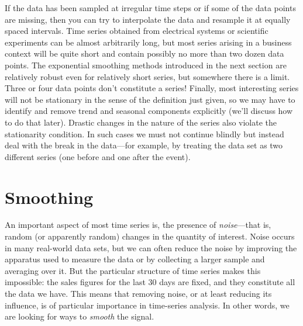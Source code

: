 If the data has been sampled at irregular time steps or if some of the
data points are missing, then you can try to interpolate the data and
resample it at equally spaced intervals. Time series obtained from
electrical systems or scientific experiments can be almost arbitrarily
long, but most series arising in a business context will be quite
short and contain possibly no more than two dozen data points. The
exponential smoothing methods introduced in the next section are
relatively robust even for relatively short series, but somewhere
there is a limit. Three or four data points don't constitute a series!
Finally, most interesting series will not be stationary in the sense
of the definition just given, so we may have to identify and remove
trend and seasonal components explicitly (we'll discuss how to do that
later). Drastic changes in the nature of the series also violate the
stationarity condition. In such cases we must not continue blindly but
instead deal with the break in the data---for example, by treating the
data set as two different series (one before and one after the event). 


\section{Smoothing}

  
An important aspect of most time series is, the presence of
\emph{noise}---that is, random (or apparently random) changes in the
quantity of\vadjust{\pagebreak} interest. Noise occurs in many real-world data sets, but
we can often reduce the noise by improving the apparatus used to
measure the data or by collecting a larger sample and averaging over
it. But the particular structure of time series makes this impossible:
the sales figures for the last 30 days are fixed, and they constitute
all the data we have. This means that removing noise, or at least
reducing its influence, is of particular importance in time-series
analysis. In other words, we are looking for ways to \emph{smooth} the
signal.


